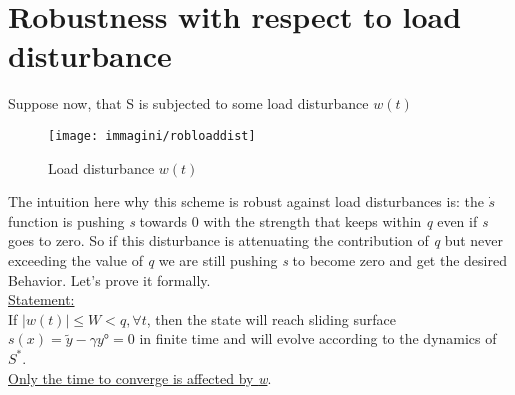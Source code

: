 \section{Robustness with respect to load disturbance}
Suppose now, that S is subjected to some load disturbance $w(t)$
\begin{figure}[H]
	\centering
	\texttt{[image: immagini/robloaddist]}
	\caption{Load disturbance $w(t)$}
	\label{fig:robloaddist}
\end{figure}
The intuition here why this scheme is robust against load disturbances is: the $\dot{s}$ function is pushing \emph{s} towards 0 with the strength that keeps within \emph{q} even if \emph{s} goes to zero. So if this disturbance is attenuating the contribution of \emph{q} but never exceeding the value of \emph{q} we are  still pushing \emph{s} to become zero and get the desired Behavior. Let's prove it formally.\\
\underline{Statement:}\\
If $|w(t)|\le W<q, \forall t$, then the state will reach sliding surface $s(x)=\tilde{y}-\gamma y°=0$ in finite time and will evolve according to the dynamics of $S^*$. \\\underline{Only the time to converge is affected by \emph{w}}.
